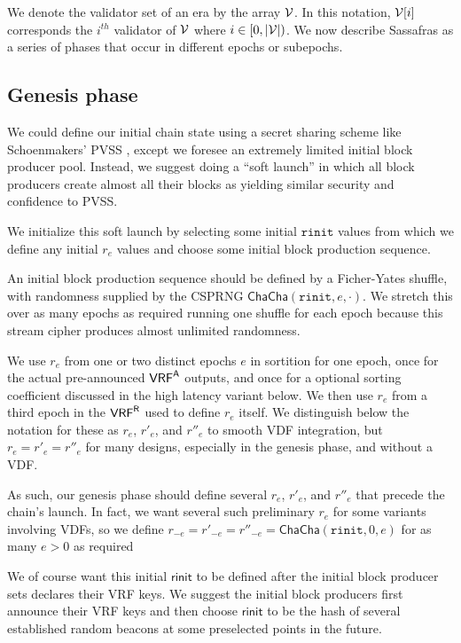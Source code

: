 We denote the validator set of an era by the array $ \mathcal{V} $.  In this notation, $ \mathcal{V}[i] $ corresponds the $ i^{th} $ validator of  $ \mathcal{V} $ where $ i \in [0, |\mathcal{V}|) $.   We now describe Sassafras as a series of phases that occur in different epochs or subepochs.

\subsection{Genesis phase}
\label{subsec:genesis_phase}
\newcommand{\rinit}{\mathtt{rinit}} %

We could define our initial chain state using a secret sharing scheme like Schoenmakers' PVSS \cite{Schoenmakers_PVSS}, except we foresee an extremely limited initial block producer pool.  
Instead, we suggest doing a ``soft launch'' in which all block producers create almost all their blocks as yielding similar security and confidence to PVSS. 

We initialize this soft launch by selecting some initial $\rinit$ values from which we define any initial $r_e$ values and choose some initial block production sequence. 

An initial block production sequence should be defined by a Ficher-Yates shuffle, with randomness supplied by the CSPRNG $\mathsf{ChaCha}(\rinit,e,\cdot)$.  We stretch this over as many epochs as required running one shuffle for each epoch because this stream cipher produces almost unlimited randomness.

We use $r_e$ from one or two distinct epochs $e$ in sortition for one epoch, once for the actual pre-announced $\mathsf{VRF}^{\mathsf{A}}$ outputs, and once for a optional sorting coefficient discussed in the high latency variant below.  We then use $r_e$ from a third epoch in the $\mathsf{VRF}^{\mathsf{R}}$ used to define $r_e$ itself.  We distinguish below the notation for these as $r_e$, $r'_e$, and $r''_e$ to smooth VDF integration, but $r_e = r'_e = r''_e$ for many designs, especially in the genesis phase, and without a VDF.

As such, our genesis phase should define several $r_e$, $r'_e$, and $r''_e$ that precede the chain's launch.  In fact, we want several such preliminary $r_e$ for some variants involving VDFs, so we define $r_{-e} = r'_{-e} = r''_{-e} = \mathsf{ChaCha}(\rinit,0,e)$ for as many $e > 0$ as required

We of course want this initial $\mathsf{rinit}$ to be defined after the initial block producer sets declares their VRF keys.  We suggest the initial block producers first announce their VRF keys and then choose $\mathsf{rinit}$ to be the hash of several established random beacons at some preselected points in the future.


